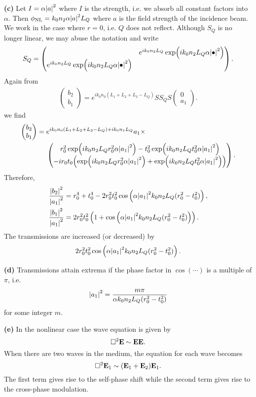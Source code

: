 \documentclass{article}
\makeatletter
\newcommand*{\shifttext}[1]{%
  \settowidth{\@tempdima}{#1}%
  \hspace{-\@tempdima}#1%
}
\newcommand{\plabel}[1]{%
\shifttext{\textbf{#1}\quad}%
}
\makeatother
\begin{document}
\plabel{(c)}%
Let $I = \alpha \abs{a}^2$ where $I$ is the strength, i.e. we absorb all constant factors into $\alpha$.
Then $\phi_{\mathrm{NL}} = k_0 n_2 \alpha \abs{a}^2 L_Q$ where $a$ is the field strength of the incidence beam.
We work in the case where $r=0$, i.e. $Q$ does not reflect.
Although $S_Q$ is no longer linear, we may abuse the notation and write
\[ S_Q = \begin{pmatrix}
    & e^{i k_0 n_2 L_Q} \exp(i k_0 n_2 L_Q \alpha \abs{\bullet}^2) \\
    e^{i k_0 n_2 L_Q} \exp(i k_0 n_2 L_Q \alpha \abs{\bullet}^2)
\end{pmatrix}. \]
Again from 
\begin{align*}
    \begin{pmatrix}
        b_2 \\ b_1
    \end{pmatrix} = e^{ik_0n_0(L_1+L_2+L_3-L_Q)} S S_Q S \begin{pmatrix}
        0 \\ a_1
    \end{pmatrix}.
\end{align*}
we find
\begin{align*}
    \begin{pmatrix}
        b_2 \\ b_1
    \end{pmatrix} &= e^{ik_0n_0(L_1+L_2+L_3-L_Q) + ik_0n_1L_Q} a_1 \times \\
    &\phantom{{}={}} \begin{pmatrix}
        r_0^2 \exp(i k_0 n_2 L_Q r_0^2 \alpha \abs{a_1}^2) - t_0^2 \exp(i k_0 n_2 L_Q t_0^2 \alpha \abs{a_1}^2) \\
        -i r_0 t_0 \qty(\exp(i k_0 n_2 L_Q r_0^2 \alpha \abs{a_1}^2) + \exp(i k_0 n_2 L_Q t_0^2 \alpha \abs{a_1}^2))
    \end{pmatrix}.
\end{align*}
Therefore,
\begin{align*}
    \frac{\abs{b_2}^2}{\abs{a_1}^2} &= r_0^4+t_0^4-2 r_0^2 t_0^2 \cos \left(\alpha \abs{a_1}^2 k_0 n_2 L_Q (r_0^2 - t_0^2)\right), \\
    \frac{\abs{b_1}^2}{\abs{a_1}^2} &= 2 r_0^2 t_0^2 \left(1+\cos \left(\alpha \abs{a_1}^2 k_0 n_2 L_Q (r_0^2 - t_0^2)\right)\right).
\end{align*}
The transmissions are increased (or decreased) by 
\[ 2 r_0^2 t_0^2 \cos \left(\alpha \abs{a_1}^2 k_0 n_2 L_Q (r_0^2 - t_0^2)\right). \]

\plabel{(d)}%
Transmissions attain extrema if the phase factor in $\cos(\cdots)$ is a multiple of $\pi$, i.e.
\[ \abs{a_1}^2 = \frac{m \pi}{\alpha k_0 n_2 L_Q (r_0^2 - t_0^2)} \]
for some integer $m$.

\plabel{(e)}%
In the nonlinear case the wave equation is given by
\[ \Box^2 \vb{E} \sim \vb{E}\vb{E}. \]
When there are two waves in the medium, the equation for each wave becomes
\[ \Box^2 \vb{E}_1 \sim (\vb{E}_1 + \vb{E}_2) \vb{E}_1. \]
The first term gives rise to the self-phase shift while the second term gives rise to the cross-phase modulation.

% 
% 
\end{document}
